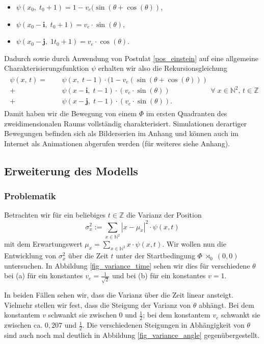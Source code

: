 \documentclass[a4paper,12pt,ngerman]{scrartcl}
\theoremstyle{plain}
\theoremstyle{plain}
\theoremstyle{plain}
\theoremstyle{plain}
\newcommand{\Z}{\mathbb{Z}}
\newcommand{\N}{\mathbb{N}}
\newcommand{\at}[1]{\;\rtimes_{#1}\;}
\begin{document}
{
\begin{itemize}
\item $\psi(x_0,\;t_0+1)=1-v_e(\sin(\theta+\cos(\theta))$,
\item $\psi(x_0-\pmb{i},\;t_0+1)=v_e\cdot\sin(\theta)$,
\item $\psi(x_0-\pmb{j},\;1t_0+1)=v_e\cdot\cos(\theta)$.
\end{itemize}
}
Dadurch sowie durch Anwendung von Postulat \ref{pos_einstein} auf eine allgemeine Charakterisierungsfunktion $\psi$ erhalten wir also die Rekursionsgleichung
\begin{align*}
\begin{split}
\psi(x,\,t)=\phantom{+}&\psi(x,\;t-1)\cdot(1-v_e(\sin(\theta+\cos(\theta)))\\
+\,&\psi(x-\pmb{i},\;t-1)\cdot(v_e\cdot\sin(\theta))\\
+\,&\psi(x-\pmb{j},\;t-1)\cdot(v_e\cdot\sin(\theta)).
\end{split} \forall\;x\in\N^2,\,t\in\Z
\end{align*}
Damit haben wir die Bewegung von einem $\Phi$ im ersten Quadranten des zweidimensionalen Raums vollständig charakterisiert. Simulationen derartiger Bewegungen befinden sich als Bilderserien im Anhang und können auch im Internet als Animationen abgerufen werden (für weiteres siehe Anhang).

\subsection{Erweiterung des Modells}

\subsubsection{Problematik}

Betrachten wir für ein beliebiges $t\in\Z$ die Varianz der Position
\[\sigma_x^2:=\sum_{x\in\N^2}|x-\mu_x|^2\cdot\psi(x,t)\]
mit dem Erwartungswert $\mu_x=\sum_{x\in\N^2}x\cdot\psi(x,t)$. Wir wollen nun die Entwicklung von $\sigma_x^2$ über die Zeit $t$ unter der Startbedingung $\Phi\at{0}(0,0)$ untersuchen. In Abbildung \ref{fig_variance_time} sehen wir dies für verschiedene $\theta$ bei (a) für ein konstantes $v_e=\frac{1}{\sqrt{2}}$ und bei (b) für ein konstantes $v=1$.

In beiden Fällen sehen wir, dass die Varianz über die Zeit linear ansteigt. Vielmehr stellen wir fest, dass die Steigung der Varianz von $\theta$ abhängt. Bei dem konstantem $v$ schwankt sie zwischen 0 und $\frac{1}{2}$; bei dem konstantem $v_e$ schwankt sie zwischen ca. $0,207$ und $\frac{1}{2}$. Die verschiedenen Steigungen in Abhängigkeit von $\theta$ sind auch noch mal deutlich in Abbildung \ref{fig_variance_angle} gegenübergestellt.
\end{document}
